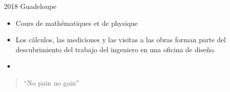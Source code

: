 \documentclass[10pt,a4paper,ragged2e,withhyper]{altacv}
\begin{document}
\begin{paracol}{2}




 {} {2018} { Guadeloupe}
\begin{itemize}
\item Cours de mathématiques et de physique
\end{itemize}

\divider


\begin{itemize}
\item Los cálculos, las mediciones y las visitas a las obras forman parte del descubrimiento del trabajo del ingeniero en una oficina de diseño.
\end{itemize}

\divider

\begin{itemize}

\item

\end{itemize}








\switchcolumn

\begin{quote}
``No pain no gain''
\end{quote}


\end{paracol}
\end{document}
